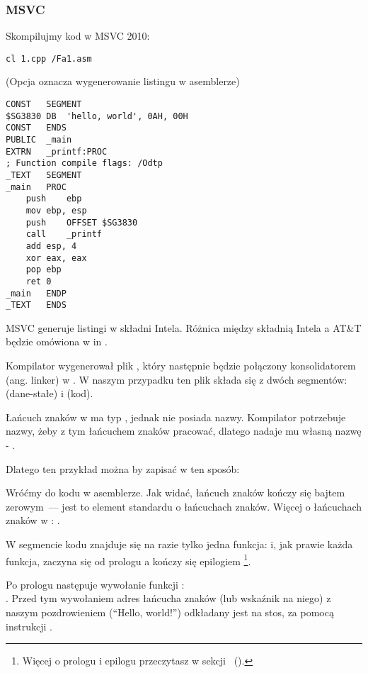 \subsubsection{MSVC}

Skompilujmy kod w MSVC 2010:

\begin{lstlisting}
cl 1.cpp /Fa1.asm
\end{lstlisting}

(Opcja  oznacza wygenerowanie listingu w asemblerze)

\begin{lstlisting}[caption=MSVC 2010,style=customasmx86]
CONST	SEGMENT
$SG3830	DB	'hello, world', 0AH, 00H
CONST	ENDS
PUBLIC	_main
EXTRN	_printf:PROC
; Function compile flags: /Odtp
_TEXT	SEGMENT
_main	PROC
	push	ebp
	mov	ebp, esp
	push	OFFSET $SG3830
	call	_printf
	add	esp, 4
	xor	eax, eax
	pop	ebp
	ret	0
_main	ENDP
_TEXT	ENDS
\end{lstlisting}

MSVC generuje listingi w składni Intela.
Różnica między składnią Intela a AT\&T będzie omówiona w in .

Kompilator wygenerował plik , który następnie będzie połączony konsolidatorem (ang. linker) w .
W naszym przypadku ten plik składa się z dwóch segmentów:  (dane-stałe) i  (kod).

\label{string_is_const_char}
Łańcuch znaków  w \CCpp ma typ , jednak nie posiada nazwy.
Kompilator potrzebuje nazwy, żeby z tym łańcuchem znaków pracować, dlatego nadaje mu własną nazwę -  .

Dlatego ten przykład można by zapisać w ten sposób:



Wróćmy do kodu w asemblerze. Jak widać, łańcuch znaków kończy się bajtem zerowym~--- jest to element standardu \CCpp o łańcuchach znaków.
Więcej o łańcuchach znaków w \CCpp: .

W segmencie kodu  znajduje się na razie tylko jedna funkcja: \main{} i, jak prawie każda funkcja, zaczyna się od prologu a kończy się epilogiem
\footnote{Więcej o prologu i epilogu przeczytasz w sekcji ~().}.

Po prologu następuje wywołanie funkcji \printf{}:\\
.
Przed tym wywołaniem adres łańcucha znaków (lub wskaźnik na niego) z naszym pozdrowieniem (``Hello, world!'') odkładany jest na stos, za pomocą instrukcji \PUSH.

